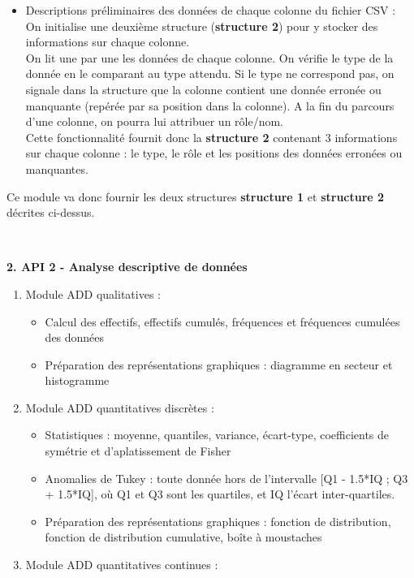 \begin{description}[style=unboxed,leftmargin=0.2cm]
\begin{enumerate}
\begin{itemize}
					\item Descriptions préliminaires des données de chaque colonne du fichier CSV :\\
					On initialise une deuxième structure (\textbf{structure 2}) pour y stocker des informations sur chaque colonne.\\
					On lit une par une les données de chaque colonne. On vérifie le type de la donnée en le comparant au type attendu. Si le type ne correspond pas, on signale dans la structure que la colonne contient une donnée erronée ou manquante (repérée par sa position dans la colonne). A la fin du parcours d'une colonne, on pourra lui attribuer un rôle/nom.\\
					Cette fonctionnalité fournit donc la \textbf{structure 2} contenant 3 informations sur chaque colonne : le type, le rôle et les positions des données erronées ou manquantes.
				\end{itemize}
				Ce module va donc fournir les deux structures \textbf{structure 1} et \textbf{structure 2} décrites ci-dessus.
			\end{enumerate}
			~\\
			\item\textbf{2. API 2 - Analyse descriptive de données}
			\begin{enumerate}
				\item Module ADD qualitatives :
					\begin{itemize}
					\item Calcul des effectifs, effectifs cumulés, fréquences et fréquences cumulées des données
					\item Préparation des représentations graphiques : diagramme en secteur et histogramme
					\end{itemize}
				\item Module ADD quantitatives discrètes :
					\begin{itemize}
					\item Statistiques : moyenne, quantiles, variance, écart-type, coefficients de symétrie et d'aplatissement de Fisher
					\item Anomalies de Tukey : toute donnée hors de l'intervalle [Q1 - 1.5*IQ ; Q3 + 1.5*IQ], où Q1 et Q3 sont les quartiles, et IQ l'écart inter-quartiles.
					\item Préparation des représentations graphiques : fonction de distribution, fonction de distribution cumulative,  boîte à moustaches
					\end{itemize}
				\item Module ADD quantitatives continues :

\end{enumerate}
\end{description}

